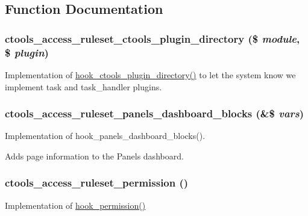 \subsection{Function Documentation}
\hypertarget{ctools__access__ruleset_8module_a0640f3df46d163f89a3e393ecf665a3a}{
\subsubsection[{ctools\_\-access\_\-ruleset\_\-ctools\_\-plugin\_\-directory}]{\setlength{\rightskip}{0pt plus 5cm}ctools\_\-access\_\-ruleset\_\-ctools\_\-plugin\_\-directory (\$ {\em module}, \/  \$ {\em plugin})}}
\label{ctools__access__ruleset_8module_a0640f3df46d163f89a3e393ecf665a3a}
Implementation of \hyperlink{group__hooks_gaf17a0de7a7ca6e6c30c766ea1e44715e}{hook\_\-ctools\_\-plugin\_\-directory()} to let the system know we implement task and task\_\-handler plugins. \hypertarget{ctools__access__ruleset_8module_ac7795e49e86c81fe209bcd0336701c41}{
\subsubsection[{ctools\_\-access\_\-ruleset\_\-panels\_\-dashboard\_\-blocks}]{\setlength{\rightskip}{0pt plus 5cm}ctools\_\-access\_\-ruleset\_\-panels\_\-dashboard\_\-blocks (\&\$ {\em vars})}}
\label{ctools__access__ruleset_8module_ac7795e49e86c81fe209bcd0336701c41}
Implementation of hook\_\-panels\_\-dashboard\_\-blocks().

Adds page information to the Panels dashboard. \hypertarget{ctools__access__ruleset_8module_a14ebe62d97136a533948fa71657f62ad}{
\subsubsection[{ctools\_\-access\_\-ruleset\_\-permission}]{\setlength{\rightskip}{0pt plus 5cm}ctools\_\-access\_\-ruleset\_\-permission ()}}
\label{ctools__access__ruleset_8module_a14ebe62d97136a533948fa71657f62ad}
Implementation of \hyperlink{group__hooks_ga2b22b45f4925f2478412477bae329713}{hook\_\-permission()} 